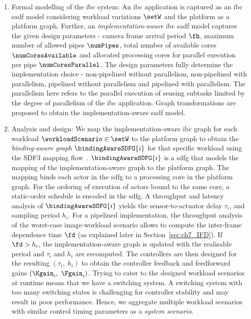 \begin{enumerate}
    \item Formal modelling of the \gls{ibc} system: An \gls{ibc} application is captured as an \gls{ibc} \gls{sadf} model considering workload variations $\setW$ and the platform as a platform graph. Further, an \emph{implementation-aware} \gls{ibc} \gls{sadf} model captures the given design parameters - camera frame arrival period $\fh$, maximum number of allowed pipes $\numPipes$, total number of available cores $\numCoresAvailable$ and allocated processing cores for parallel execution per pipe $\numCoresParallel$.
    The design parameters fully determine the implementation choice - non-pipelined without parallelism, non-pipelined with parallelism, pipelined without parallelism and pipelined with parallelism. The parallelism here refers to the parallel execution of sensing subtasks limited by the degree of parallelism of the \gls{ibc} application.
    Graph transformations are proposed to obtain the implementation-aware \gls{sadf} model.
    \item Analysis and design: We map the implementation-aware \gls{ibc} graph for each workload $\workloadScenario \in \setW$ to the platform graph to obtain the \emph{binding-aware graph} $\bindingAwareSDFG{i}$ for that specific workload using the SDF3 mapping flow~\cite{stuijk2007}. 
    $\bindingAwareSDFG{i}$ is a \gls{sdfg} that models the mapping of the implementation-aware graph to the platform graph. The mapping binds each actor in the \gls{sdfg} to a processing core in the platform graph. For the ordering of execution of actors bound to the same core, a static-order schedule is encoded in the \gls{sdfg}.
    A throughput and latency analysis of $\bindingAwareSDFG{i}$ yields the sensor-to-actuator delay $\tau_i$, and sampling period $h_i$.
    For a pipelined implementation, the throughput analysis of the worst-case image-workload scenario allows to compute the inter-frame dependence time $\fd$ (as explained later in Section~\ref{sec:ch7_IFD}). 
    If $\fd>h_i$, the implementation-aware graph is updated with the realisable period and $\tau_i$ and $h_i$ are recomputed. 
     The controllers are then designed for the resulting $(\tau_i,\ h_i)$ to obtain the controller feedback and feedforward gains $(\Kgain_i,\ \Fgain_i)$.
     Trying to cater to the designed workload scenarios at runtime means that we have a switching system. A switching system with too many switching states is challenging for controller stability and may result in poor performance. 
     Hence, we aggregate multiple workload scenarios with similar control timing parameters as a \emph{system scenario}.

\end{enumerate}
